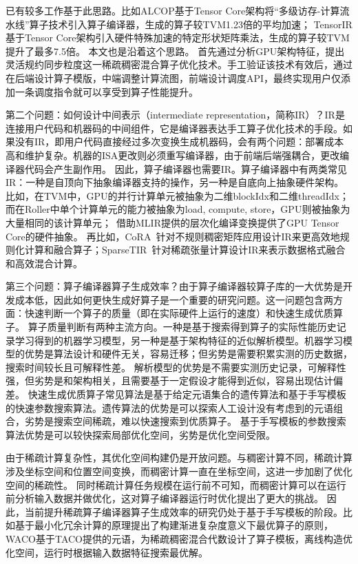 已有较多工作基于此思路。比如ALCOP\cite{ALCOP}基于Tensor Core架构将“多级访存-计算流水线”算子技术引入算子编译器，生成的算子较TVM1.23倍的平均加速；
TensorIR\cite{TensorIR}基于Tensor Core架构引入硬件特殊加速的特定形状矩阵乘法，生成的算子较TVM提升了最多7.5倍。 本文也是沿着这个思路。
首先通过分析GPU架构特征，提出灵活规约同步粒度这一稀疏稠密混合算子优化技术。手工验证该技术有效后，通过在后端设计算子模版，中端调整计算流图，前端设计调度API，最终实现用户仅添加一条调度指令就可以享受到算子性能提升。

第二个问题：如何设计中间表示（intermediate representation，简称IR）？IR是连接用户代码和机器码的中间组件\cite{IR}，它是编译器表达手工算子优化技术的手段。如果没有IR，即用户代码直接经过多次变换生成机器码，会有两个问题：部署成本高和维护复杂。机器的ISA更改则必须重写编译器，由于前端后端强耦合，更改编译器代码会产生副作用\cite{LLVM}。
因此，算子编译器也需要IR。算子编译器中有两类常见IR：一种是自顶向下抽象编译器支持的操作，另一种是自底向上抽象硬件架构。
比如，在TVM\cite{tvm}中，GPU的并行计算单元被抽象为二维blockIdx和二维threadIdx；而在Roller\cite{Roller}中单个计算单元的能力被抽象为load, compute, store，GPU则被抽象为大量相同的该计算单元；~\cite{mlir-tc}借助MLIR提供的层次化编译变换提供了GPU Tensor Core的硬件抽象。
再比如，CoRA~\cite{CoRA}针对不规则稠密矩阵应用设计IR来更高效地规则化计算和融合算子；SparseTIR~\cite{SparseTIR}针对稀疏张量计算设计IR来表示数据格式融合和高效混合计算。

第三个问题：算子编译器算子生成效率？由于算子编译器较算子库的一大优势是开发成本低，因此如何更快生成好算子是一个重要的研究问题。这一问题包含两方面：快速判断一个算子的质量（即在实际硬件上运行的速度）和快速生成优质算子。
算子质量判断有两种主流方向。一种是基于搜索得到算子的实际性能历史记录学习得到的机器学习模型，另一种是基于架构特征的近似解析模型。机器学习模型的优势是算法设计和硬件无关，容易迁移；但劣势是需要积累实测的历史数据，搜索时间较长且可解释性差\cite{AutoTVM,Ansor,AMOS}。
解析模型的优势是不需要实测历史记录，可解释性强，但劣势是和架构相关，且需要基于一定假设才能得到近似，容易出现估计偏差\cite{GNNAdvisor,Roller,ALCOP}。
快速生成优质算子常见算法是基于给定元语集合的遗传算法和基于手写模板的快速参数搜索算法。遗传算法的优势是可以探索人工设计没有考虑到的元语组合，劣势是搜索空间稀疏，难以快速搜索到优质算子\cite{Hidet}。
基于手写模板的参数搜索算法优势是可以较快探索局部优化空间，劣势是优化空间受限\cite{Auto-Halide}。

由于稀疏计算复杂性，其优化空间构建仍是开放问题。与稠密计算不同，稀疏计算涉及坐标空间和位置空间变换，而稠密计算一直在坐标空间，这进一步加剧了优化空间的稀疏性\cite{senanayake:2020:scheduling}。
同时稀疏计算任务规模在运行前不可知，而稠密计算可以在运行前分析输入数据并做优化，这对算子编译器运行时优化提出了更大的挑战\cite{Dynamic-tiling}。
因此，当前提升稀疏算子编译器算子生成效率的研究仍处于基于手写模板的阶段。比如\cite{ahrens:2022:autoscheduling}基于最小化冗余计算的原理提出了构建渐进复杂度意义下最优算子的原则，
WACO\cite{WACO}基于TACO\cite{kjolstad:2017:taco}提供的元语，为稀疏稠密混合代数设计了算子模板，离线构造优化空间，运行时根据输入数据特征搜索最优解。